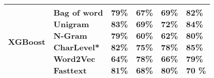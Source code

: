 \documentclass[sn-mathphys,Numbered]{sn-jnl}%
\begin{document}
\begin{table}[ht]
\begin{tabular}{llllll}
\\\hline
XGBoost & \makecell{Bag of word\\  Unigram\\ N-Gram\\CharLevel*\\ Word2Vec \\ Fasttext} & 
\makecell{79\% \\\textbf{83\%}\\ 79\%\\ 82\% \\ 64\%\\ 81\%}&
\makecell{67\% \\ 69\%\\ 60\%\\\textbf{75\%} \\ 78\% \\ 68\%}&
\makecell{69\% \\ 72\%\\62\%\\78\% \\ 66\% \\ \textbf{80\%}}&
\makecell{82\% \\ 84\%\\80\%\\\textbf{85\%}\\ 79\% \\70 \%}\\
\hline


\end{tabular}
\end{table}
\end{document}
